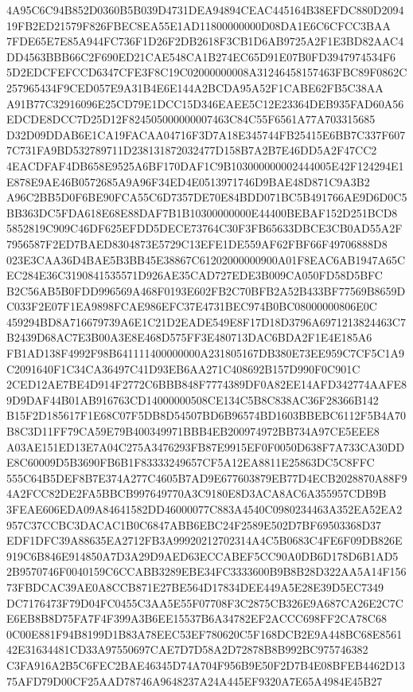 \documentclass[UTF8,fontset=fandol,zihao=-4,a4paper]{ctexart}
\begin{document}
{{4A95C6C94B852D0360B5B039D4731DEA94894CEAC445164B38EFDC880D209419FB2ED21579F826FBEC8EA55E1AD11800000000D08DA1E6C6CFCC3BAA
7FDE65E7E85A944FC736F1D26F2DB2618F3CB1D6AB9725A2F1E3BD82AAC4DD4563BBB66C2F690ED21CAE548CA1B274EC65D91E07B0FD3947974534F6
5D2EDCFEFCCD6347CFE3F8C19C02000000008A31246458157463FBC89F0862C257965434F9CED057E9A31B4E6E144A2BCDA95A52F1CABE62FB5C38AA
A91B77C32916096E25CD79E1DCC15D346EAEE5C12E23364DEB935FAD60A56EDCDE8DCC7D25D12F824505000000007463C84C55F6561A77A703315685
D32D09DDAB6E1CA19FACAA04716F3D7A18E345744FB25415E6BB7C337F6077C731FA9BD532789711D238131872032477D158B7A2B7E46DD5A2F47CC2
4EACDFAF4DB658E9525A6BF170DAF1C9B103000000002444005E42F124294E1E878E9AE46B0572685A9A96F34ED4E0513971746D9BAE48D871C9A3B2
A96C2BB5D0F6BE90FCA55C6D7357DE70E84BDD071BC5B491766AE9D6D0C5BB363DC5FDA618E68E88DAF7B1B10300000000E44400BEBAF152D251BCD8
5852819C909C46DF625EFDD5DECE73764C30F3FB65633DBCE3CB0AD55A2F7956587F2ED7BAED8304873E5729C13EFE1DE559AF62FBF66F49706888D8
023E3CAA36D4BAE5B3BB45E38867C61202000000900A01F8EAC6AB1947A65CEC284E36C3190841535571D926AE35CAD727EDE3B009CA050FD58D5BFC
B2C56AB5B0FDD996569A468F0193E602FB2C70BFB2A52B433BF77569B8659DC033F2E07F1EA9898FCAE986EFC37E4731BEC974B0BC08000000806E0C
459294BD8A716679739A6E1C21D2EADE549E8F17D18D3796A6971213824463C7B2439D68AC7E3B00A3E8E468D575FF3E480713DAC6BDA2F1E4E185A6
FB1AD138F4992F98B641111400000000A231805167DB380E73EE959C7CF5C1A9C2091640F1C34CA36497C41D93EB6AA271C408692B157D990F0C901C
2CED12AE7BE4D914F2772C6BBB848F7774389DF0A82EE14AFD342774AAFE89D9DAF44B01AB916763CD14000000508CE134C5B8C838AC36F28366B142
B15F2D185617F1E68C07F5DB8D54507BD6B96574BD1603BBEBC6112F5B4A70B8C3D11FF79CA59E79B400349971BBB4EB200974972BB734A97CE5EEE8
A03AE151ED13E7A04C275A3476293FB87E9915EF0F0050D638F7A733CA30DDE8C60009D5B3690FB6B1F83333249657CF5A12EA8811E25863DC5C8FFC
555C64B5DEF8B7E374A277C4605B7AD9E677603879EB77D4ECB2028870A88F94A2FCC82DE2FA5BBCB997649770A3C9180E8D3ACA8AC6A355957CDB9B
3FEAE606EDA09A84641582DD46000077C883A4540C0980234463A352EA52EA2957C37CCBC3DACAC1B0C6847ABB6EBC24F2589E502D7BF69503368D37
EDF1DFC39A88635EA2712FB3A99920212702314A4C5B0683C4FE6F09DB826E919C6B846E914850A7D3A29D9AED63ECCABEF5CC90A0DB6D178D6B1AD5
2B9570746F0040159C6CCABB3289EBE34FC3333600B9B8B28D322AA5A14F15673FBDCAC39AE0A8CCB871E27BE564D17834DEE449A5E28E39D5EC7349
DC7176473F79D04FC0455C3AA5E55F07708F3C2875CB326E9A687CA26E2C7CE6EB8B8D75FA7F4F399A3B6EE15537B6A34782EF2ACCC698FF2CA78C68
0C00E881F94B8199D1B83A78EEC53EF780620C5F168DCB2E9A448BC68E856142E31634481CD33A97550697CAE7D7D58A2D72878B8B992BC975746382
C3FA916A2B5C6FEC2BAE46345D74A704F956B9E50F2D7B4E08BFEB4462D1375AFD79D00CF25AAD78746A9648237A24A445EF9320A7E65A4984E45B27
}}
\end{document}
